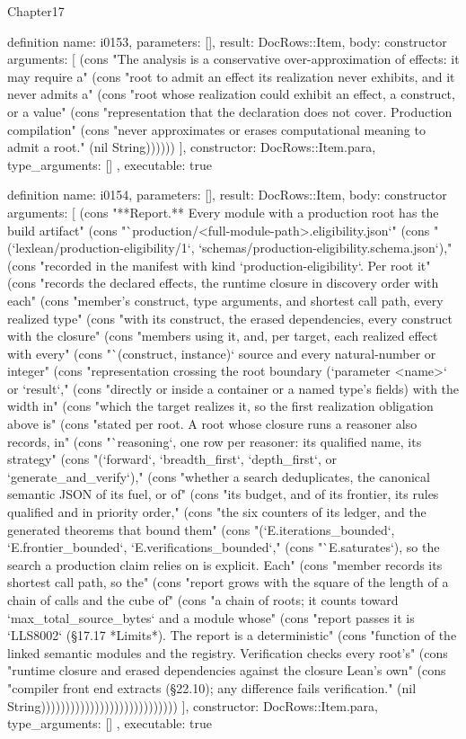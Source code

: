 \begin{lexlean}{Chapter17}
\begin{semanticmodule}
definition{
  name: i0153,
  parameters: [],
  result: DocRows::Item,
  body: constructor{
    arguments: [
      (cons "The analysis is a conservative over-approximation of effects: it may require a" (cons "root to admit an effect its realization never exhibits, and it never admits a" (cons "root whose realization could exhibit an effect, a construct, or a value" (cons "representation that the declaration does not cover. Production compilation" (cons "never approximates or erases computational meaning to admit a root." (nil String))))))
    ],
    constructor: DocRows::Item.para,
    type_arguments: []
  },
  executable: true
}

definition{
  name: i0154,
  parameters: [],
  result: DocRows::Item,
  body: constructor{
    arguments: [
      (cons "**Report.** Every module with a production root has the build artifact" (cons "`production/<full-module-path>.eligibility.json`" (cons "(`lexlean/production-eligibility/1`, `schemas/production-eligibility.schema.json`)," (cons "recorded in the manifest with kind `production-eligibility`. Per root it" (cons "records the declared effects, the runtime closure in discovery order with each" (cons "member's construct, type arguments, and shortest call path, every realized type" (cons "with its construct, the erased dependencies, every construct with the closure" (cons "members using it, and, per target, each realized effect with every" (cons "`(construct, instance)` source and every natural-number or integer" (cons "representation crossing the root boundary (`parameter <name>` or `result`," (cons "directly or inside a container or a named type's fields) with the width in" (cons "which the target realizes it, so the first realization obligation above is" (cons "stated per root. A root whose closure runs a reasoner also records, in" (cons "`reasoning`, one row per reasoner: its qualified name, its strategy" (cons "(`forward`, `breadth_first`, `depth_first`, or `generate_and_verify`)," (cons "whether a search deduplicates, the canonical semantic JSON of its fuel, or of" (cons "its budget, and of its frontier, its rules qualified and in priority order," (cons "the six counters of its ledger, and the generated theorems that bound them" (cons "(`E.iterations_bounded`, `E.frontier_bounded`, `E.verifications_bounded`," (cons "`E.saturates`), so the search a production claim relies on is explicit. Each" (cons "member records its shortest call path, so the" (cons "report grows with the square of the length of a chain of calls and the cube of" (cons "a chain of roots; it counts toward `max_total_source_bytes` and a module whose" (cons "report passes it is `LLS8002` (§17.17 *Limits*). The report is a deterministic" (cons "function of the linked semantic modules and the registry. Verification checks every root's" (cons "runtime closure and erased dependencies against the closure Lean's own" (cons "compiler front end extracts (§22.10); any difference fails verification." (nil String))))))))))))))))))))))))))))
    ],
    constructor: DocRows::Item.para,
    type_arguments: []
  },
  executable: true
}


\end{semanticmodule}
\end{lexlean}
